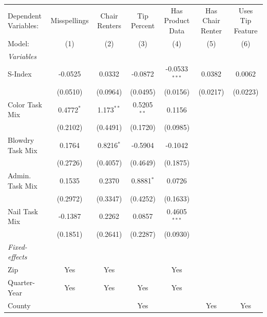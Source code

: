 
\begingroup
\centering
\begin{tabular}{lcccccc}
   \tabularnewline \midrule \midrule
   Dependent Variables: & Misspellings & Chair Renters & Tip Percent   & Has Product Data & Has Chair Renter & Uses Tip Feature\\  
   Model:               & (1)          & (2)           & (3)           & (4)              & (5)              & (6)\\  
   \midrule
   \emph{Variables}\\
   S-Index              & -0.0525      & 0.0332        & -0.0872       & -0.0533$^{***}$  & 0.0382           & 0.0062\\   
                        & (0.0510)     & (0.0964)      & (0.0495)      & (0.0156)         & (0.0217)         & (0.0223)\\   
   Color Task Mix       & 0.4772$^{*}$ & 1.173$^{**}$  & 0.5205$^{**}$ & 0.1156           &                  &   \\   
                        & (0.2102)     & (0.4491)      & (0.1720)      & (0.0985)         &                  &   \\   
   Blowdry Task Mix     & 0.1764       & 0.8216$^{*}$  & -0.5904       & -0.1042          &                  &   \\   
                        & (0.2726)     & (0.4057)      & (0.4649)      & (0.1875)         &                  &   \\   
   Admin. Task Mix      & 0.1535       & 0.2370        & 0.8881$^{*}$  & 0.0726           &                  &   \\   
                        & (0.2972)     & (0.3347)      & (0.4252)      & (0.1633)         &                  &   \\   
   Nail Task Mix        & -0.1387      & 0.2262        & 0.0857        & 0.4605$^{***}$   &                  &   \\   
                        & (0.1851)     & (0.2641)      & (0.2287)      & (0.0930)         &                  &   \\   
   \midrule
   \emph{Fixed-effects}\\
   Zip                  & Yes          & Yes           &               & Yes              &                  & \\  
   Quarter-Year         & Yes          & Yes           & Yes           & Yes              &                  & \\  
   County               &              &               & Yes           &                  & Yes              & Yes\\  

\end{tabular}
